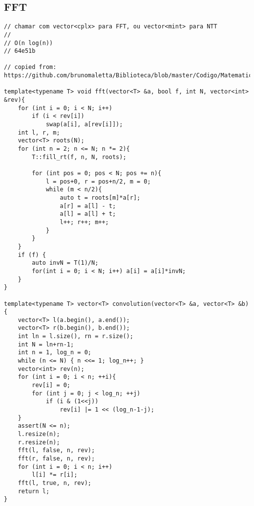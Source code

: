 \documentclass[12pt, a4paper, twoside]{article}
\begin{document}
\subsection{FFT
}
\begin{lstlisting}
// chamar com vector<cplx> para FFT, ou vector<mint> para NTT
//
// O(n log(n))
// 64e51b

// copied from: https://github.com/brunomaletta/Biblioteca/blob/master/Codigo/Matematica/convolution.cpp

template<typename T> void fft(vector<T> &a, bool f, int N, vector<int> &rev){
	for (int i = 0; i < N; i++)
		if (i < rev[i])
			swap(a[i], a[rev[i]]);
	int l, r, m;
	vector<T> roots(N);
	for (int n = 2; n <= N; n *= 2){
	    T::fill_rt(f, n, N, roots);

		for (int pos = 0; pos < N; pos += n){
			l = pos+0, r = pos+n/2, m = 0;
			while (m < n/2){
				auto t = roots[m]*a[r];
				a[r] = a[l] - t;
				a[l] = a[l] + t;
				l++; r++; m++;
			}
		}
	}
	if (f) {
		auto invN = T(1)/N;
		for(int i = 0; i < N; i++) a[i] = a[i]*invN;
	}
}

template<typename T> vector<T> convolution(vector<T> &a, vector<T> &b) {
	vector<T> l(a.begin(), a.end());
	vector<T> r(b.begin(), b.end());
	int ln = l.size(), rn = r.size();
	int N = ln+rn-1;
	int n = 1, log_n = 0;
	while (n <= N) { n <<= 1; log_n++; }
	vector<int> rev(n);
	for (int i = 0; i < n; ++i){
		rev[i] = 0;
		for (int j = 0; j < log_n; ++j)
			if (i & (1<<j))
				rev[i] |= 1 << (log_n-1-j);
	}
	assert(N <= n);
	l.resize(n);
	r.resize(n);
	fft(l, false, n, rev);
	fft(r, false, n, rev);
	for (int i = 0; i < n; i++)
		l[i] *= r[i];
	fft(l, true, n, rev);
	return l;
}
\end{lstlisting}
\end{document}
